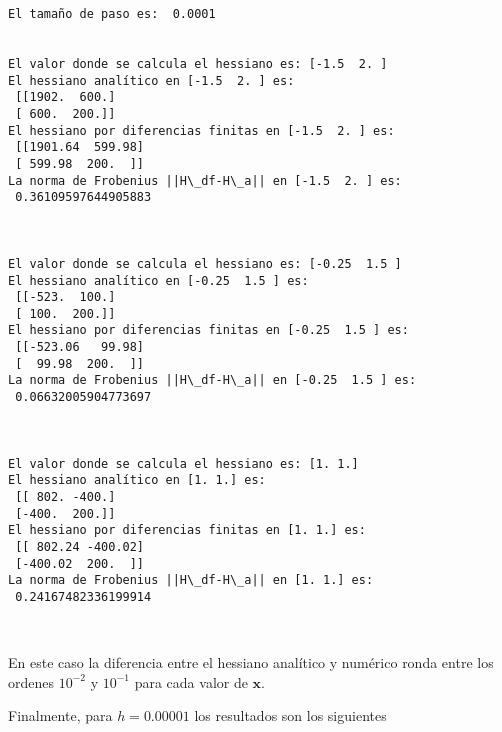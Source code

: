 \documentclass[11pt]{article}
\begin{document}
    \begin{Verbatim}[commandchars=\\\{\}]
El tamaño de paso es:  0.0001


El valor donde se calcula el hessiano es: [-1.5  2. ]
El hessiano analítico en [-1.5  2. ] es:
 [[1902.  600.]
 [ 600.  200.]]
El hessiano por diferencias finitas en [-1.5  2. ] es:
 [[1901.64  599.98]
 [ 599.98  200.  ]]
La norma de Frobenius ||H\_df-H\_a|| en [-1.5  2. ] es:
 0.36109597644905883



El valor donde se calcula el hessiano es: [-0.25  1.5 ]
El hessiano analítico en [-0.25  1.5 ] es:
 [[-523.  100.]
 [ 100.  200.]]
El hessiano por diferencias finitas en [-0.25  1.5 ] es:
 [[-523.06   99.98]
 [  99.98  200.  ]]
La norma de Frobenius ||H\_df-H\_a|| en [-0.25  1.5 ] es:
 0.06632005904773697



El valor donde se calcula el hessiano es: [1. 1.]
El hessiano analítico en [1. 1.] es:
 [[ 802. -400.]
 [-400.  200.]]
El hessiano por diferencias finitas en [1. 1.] es:
 [[ 802.24 -400.02]
 [-400.02  200.  ]]
La norma de Frobenius ||H\_df-H\_a|| en [1. 1.] es:
 0.24167482336199914



    \end{Verbatim}

    En este caso la diferencia entre el hessiano analítico y numérico ronda
entre los ordenes \(10^{-2}\) y \(10^{-1}\) para cada valor de
\(\mathbf{x}\).

Finalmente, para \(h=0.00001\) los resultados son los siguientes
\end{document}
